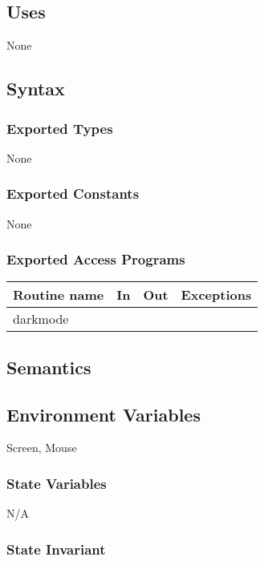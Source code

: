 \documentclass[12pt]{article}
\begin{document}
\subsection* {Uses}

None

\subsection* {Syntax}

\subsubsection* {Exported Types}

None

\subsubsection* {Exported Constants}

None

\subsubsection* {Exported Access Programs}
\begin{tabular}{| l | l | l | p{6cm} |}
\hline
\textbf{Routine name} & \textbf{In} & \textbf{Out} & \textbf{Exceptions}\\
\hline
darkmode & ~ & ~ &  \\
\hline
\end{tabular}


\subsection* {Semantics}

\subsection*{Environment Variables}

Screen, Mouse

\subsubsection* {State Variables}
N/A

\subsubsection* {State Invariant}
\end{document}
